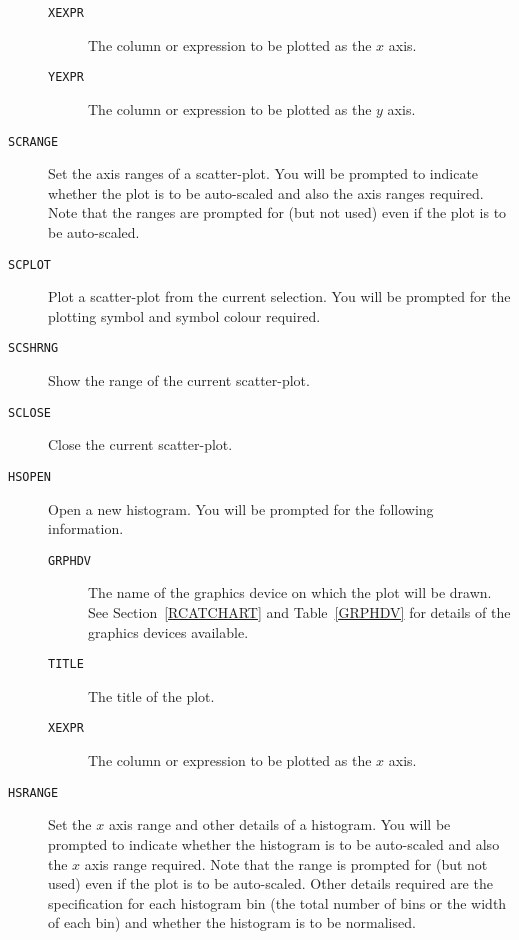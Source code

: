 \documentclass[twoside,11pt]{article}
\renewcommand{\_}{\texttt{\symbol{95}}}
\begin{document}
\begin{description}
\begin{description}
    \item[ {\tt XEXPR} ] The column or expression to be plotted as
     the $x$\/ axis.

    \item[ {\tt YEXPR} ] The column or expression to be plotted as
     the $y$\/ axis.

  \end{description}

  \item[ {\tt SCRANGE} ] Set the axis ranges of a scatter-plot.
   You will be prompted to indicate whether the plot is to be
   auto-scaled and also the axis ranges required.  Note that the
   ranges are prompted for (but not used) even if the plot is to be
   auto-scaled.

  \item[ {\tt SCPLOT} ] Plot a scatter-plot from the current selection.
   You will be prompted for the plotting symbol and symbol colour
   required.

  \item[ {\tt SCSHRNG} ] Show the range of the current scatter-plot.

  \item[ {\tt SCLOSE} ] Close the current scatter-plot.

  \item[ {\tt HSOPEN} ] Open a new histogram.  You will be prompted
   for the following information.

  \begin{description}

    \item[ {\tt GRPHDV} ] The name of the graphics device on which
     the plot will be drawn.  See Section~\ref{RCATCHART} and
     Table~\ref{GRPHDV} for details of the graphics devices available.

    \item[ {\tt TITLE} ] The title of the plot.

    \item[ {\tt XEXPR} ] The column or expression to be plotted as
     the $x$\/ axis.

  \end{description}

  \item[ {\tt HSRANGE} ] Set the $x$\/ axis range and other details
   of a histogram.  You will be prompted to indicate whether the histogram
   is to be auto-scaled and also the $x$\/ axis range required.  Note that
   the range is prompted for (but not used) even if the plot is to be
   auto-scaled.  Other details required are the specification for each
   histogram bin (the total number of bins or the width of each bin)
   and whether the histogram is to be normalised.


\end{description}
\end{document}
